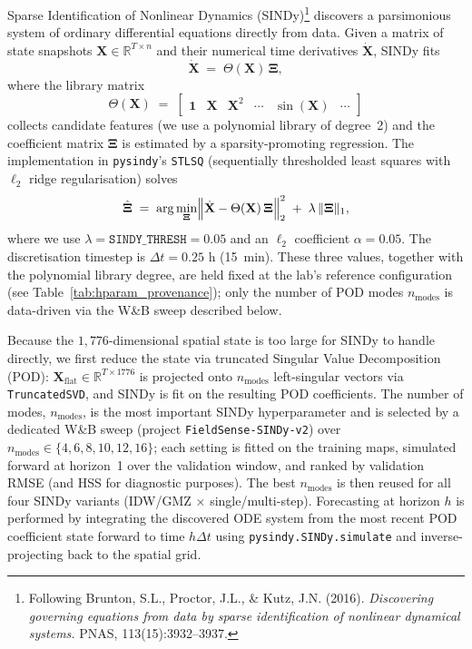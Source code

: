 \documentclass[12pt, a4paper]{article}
\begin{document}
Sparse Identification of Nonlinear Dynamics
(SINDy)\footnote{Following Brunton, S.L., Proctor, J.L., \& Kutz, J.N.
(2016). \emph{Discovering governing equations from data by sparse
identification of nonlinear dynamical systems.} PNAS,
113(15):3932--3937.} \cite{brunton2016sindy} discovers a parsimonious
system of ordinary differential equations directly from data. Given a
matrix of state snapshots \(\mathbf{X}\in\mathbb{R}^{T\times n}\) and
their numerical time derivatives \(\dot{\mathbf{X}}\), SINDy fits
\begin{equation}
  \dot{\mathbf{X}} \;=\; \Theta(\mathbf{X})\,\boldsymbol{\Xi}, \label{eq:sindy_dyn}
\end{equation}
where the library matrix
\begin{equation}
  \Theta(\mathbf{X}) \;=\; \begin{bmatrix}
    \mathbf{1} & \mathbf{X} & \mathbf{X}^{2} & \cdots & \sin(\mathbf{X}) & \cdots
  \end{bmatrix} \label{eq:sindy_lib}
\end{equation}
collects candidate features (we use a polynomial library of degree~2)
and the coefficient matrix \(\boldsymbol{\Xi}\) is estimated by a
sparsity-promoting regression. The implementation in
\texttt{pysindy}'s \texttt{STLSQ} (sequentially thresholded least
squares with \(\ell_2\) ridge regularisation) solves
\begin{equation}
  \hat{\boldsymbol{\Xi}} \;=\;
  \arg\min_{\boldsymbol{\Xi}}
  \Bigl\|\dot{\mathbf{X}} - \Theta(\mathbf{X})\,\boldsymbol{\Xi}\Bigr\|_{2}^{2}
  \;+\; \lambda\,\|\boldsymbol{\Xi}\|_{1}, \label{eq:sindy_lasso}
\end{equation}
where we use \(\lambda = \texttt{SINDY\_THRESH} = 0.05\) and an
\(\ell_2\) coefficient \(\alpha = 0.05\). The discretisation timestep is
\(\Delta t = 0.25\) h (15~min). These three values, together with the
polynomial library degree, are held fixed at the lab's reference
configuration (see Table~\ref{tab:hparam_provenance}); only the number
of POD modes \(n_{\text{modes}}\) is data-driven via the W\&B sweep
described below.

Because the \(1{,}776\)-dimensional spatial state is too large for SINDy
to handle directly, we first reduce the state via truncated Singular
Value Decomposition (POD): \(\mathbf{X}_{\text{flat}} \in
\mathbb{R}^{T\times 1776}\) is projected onto \(n_{\text{modes}}\)
left-singular vectors via \texttt{TruncatedSVD}, and SINDy is fit on
the resulting POD coefficients. The number of modes,
\(n_{\text{modes}}\), is the most important SINDy hyperparameter and
is selected by a dedicated W\&B sweep (project
\texttt{FieldSense-SINDy-v2}) over \(n_{\text{modes}} \in
\{4, 6, 8, 10, 12, 16\}\); each setting is fitted on the training
maps, simulated forward at horizon~1 over the validation window, and
ranked by validation RMSE (and HSS for diagnostic purposes). The
best \(n_{\text{modes}}\) is then reused for all four SINDy variants
(IDW/GMZ \(\times\) single/multi-step). Forecasting at horizon \(h\)
is performed by integrating the discovered ODE system from the most
recent POD coefficient state forward to time \(h\Delta t\) using
\texttt{pysindy.SINDy.simulate} and inverse-projecting back to the
spatial grid.
\end{document}
